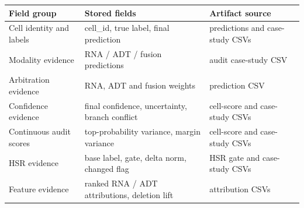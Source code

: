 \begin{tabular}{lll}
\toprule
Field group & Stored fields & Artifact source \\
\midrule
Cell identity and labels & cell\_id, true label, final prediction & predictions and case-study CSVs \\
Modality evidence & RNA / ADT / fusion predictions & audit case-study CSV \\
Arbitration evidence & RNA, ADT and fusion weights & prediction CSV \\
Confidence evidence & final confidence, uncertainty, branch conflict & cell-score and case-study CSVs \\
Continuous audit scores & top-probability variance, margin variance & cell-score and case-study CSVs \\
HSR evidence & base label, gate, delta norm, changed flag & HSR gate and case-study CSVs \\
Feature evidence & ranked RNA / ADT attributions, deletion lift & attribution CSVs \\
\bottomrule
\end{tabular}
